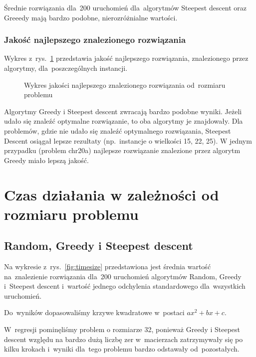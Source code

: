 \documentclass[a4paper,10pt]{article}
\begin{document}
Średnie rozwiązania dla~200 uruchomień dla~algorytmów Steepest descent oraz Greeedy mają bardzo podobne, nierozróżnialne wartości.

\subsubsection{Jakość najlepszego znalezionego rozwiązania}
Wykres z~rys.~\ref{fig:qualityvssizemax} przedstawia jakość najlepszego rozwiązania, znalezionego przez algorytmy, dla~poszczególnych instancji.

\begin{figure}[!htpb]
\begin{center}

\caption{Wykres jakości najlepszego znalezionego rozwiązania od~rozmiaru problemu}
\label{fig:qualityvssizemax}
\end{center}
\end{figure}

Algorytmy Greedy i Steepest descent zwracają bardzo podobne wyniki.
Jeżeli udało się znaleźć optymalne rozwiązanie, to oba algorytmy je znajdowały.
Dla problemów, gdzie nie udało się znaleźć optymalnego rozwiązania, Steepest Descent osiągał lepsze rezultaty (np.~instancje o wielkości 15, 22, 25).
W jednym przypadku (problem chr20a) najlepsze rozwiązanie znalezione przez algorytm Greedy miało lepszą jakość. 

\section{Czas działania w zależności od rozmiaru problemu}
\subsection{Random, Greedy i Steepest descent}
Na wykresie z~rys.~\ref{fig:timesize} przedstawiona jest średnia wartość na~znalezienie rozwiązania
dla~200 uruchomień algorytmów Random, Greedy i~Steepest descent
i~wartość jednego odchylenia standardowego dla~wszystkich uruchomień.

Do~wyników dopasowaliśmy krzywe kwadratowe w~postaci $ax^2+bx+c$.

W~regresji pominęliśmy problem o rozmiarze 32, ponieważ Greedy i Steepest descent względu na bardzo dużą liczbę zer
w~macierzach zatrzymywały się po kilku krokach i~wyniki dla~tego problemu bardzo odstawały od~pozostałych.

\end{document}
